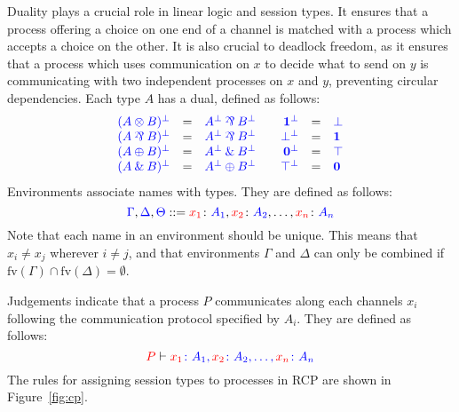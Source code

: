 \documentclass[a4paper,UKenglish]{lipics-v2016}
\begin{document}
Duality plays a crucial role in linear logic and session types. It ensures that
a process offering a choice on one end of a channel is matched with a process
which accepts a choice on the other. It is also crucial to deadlock freedom, as
it ensures that a process which uses communication on $x$ to decide what to send
on $y$ is communicating with two independent processes on $x$ and $y$,
preventing circular dependencies. Each type $A$ has a dual, defined as follows:
\[
  \begin{array}{rclcrcl}
    \tm{( A \tens B )^\bot} &=& \tm{A^\bot \parr B^\bot}&&
    \tm{\one^\bot}          &=& \tm{\bot}\\
    \tm{( A \parr B )^\bot} &=& \tm{A^\bot \parr B^\bot}&&
    \tm{\bot^\bot}          &=& \tm{\one}\\
    \tm{( A \plus B )^\bot} &=& \tm{A^\bot \with B^\bot}&&
    \tm{\nil^\bot}          &=& \tm{\top}\\
    \tm{( A \with B )^\bot} &=& \tm{A^\bot \plus B^\bot}&&
    \tm{\top^\bot}          &=& \tm{\nil}
  \end{array}
\]
Environments associate names with types. They are defined as follows:
\[
  \blue{\Gamma},\blue{\Delta},\blue{\Theta} ::=
  \tm[x_1]{A_1},\tm[x_2]{A_2},\dots,\tm[x_n]{A_n}
\]
Note that each name in an environment should be unique. This means that $x_i
\neq x_j$ wherever $i \neq j$, and that environments $\Gamma$ and $\Delta$ can
only be combined if $\text{fv}(\Gamma) \cap \text{fv}(\Delta) = \emptyset$.

Judgements indicate that a process $P$ communicates along each channels $x_i$
following the communication protocol specified by $A_i$. They are defined as
follows:
\[
  \seq[{ P }]{ \tm[x_1]{A_1},\tm[x_2]{A_2},\dots,\tm[x_n]{A_n} }
\]
The rules for assigning session types to processes in RCP are shown in
Figure~\ref{fig:cp}.



% 
%
%
%
%
%
%
%

\clearpage

\end{document}

